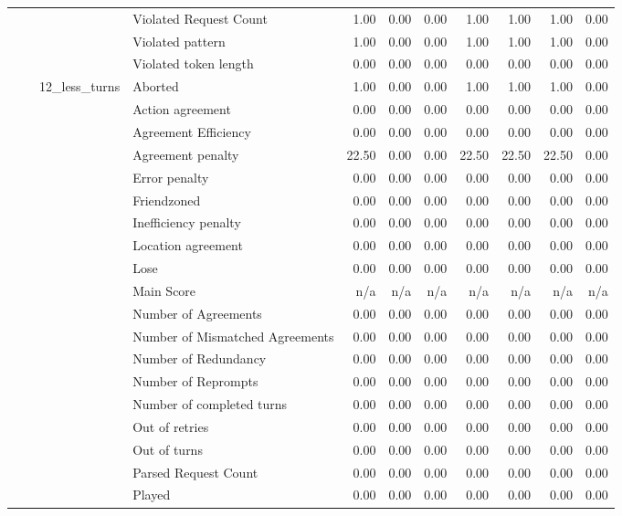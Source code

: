 \begin{tabular}{llllrrrrrrr}
 &  &  & Violated Request Count & 1.00 & 0.00 & 0.00 & 1.00 & 1.00 & 1.00 & 0.00 \\
 &  &  & Violated pattern & 1.00 & 0.00 & 0.00 & 1.00 & 1.00 & 1.00 & 0.00 \\
 &  &  & Violated token length & 0.00 & 0.00 & 0.00 & 0.00 & 0.00 & 0.00 & 0.00 \\
\cline{3-11}
 &  & \multirow[t]{27}{*}{12_less_turns} & Aborted & 1.00 & 0.00 & 0.00 & 1.00 & 1.00 & 1.00 & 0.00 \\
 &  &  & Action agreement & 0.00 & 0.00 & 0.00 & 0.00 & 0.00 & 0.00 & 0.00 \\
 &  &  & Agreement Efficiency & 0.00 & 0.00 & 0.00 & 0.00 & 0.00 & 0.00 & 0.00 \\
 &  &  & Agreement penalty & 22.50 & 0.00 & 0.00 & 22.50 & 22.50 & 22.50 & 0.00 \\
 &  &  & Error penalty & 0.00 & 0.00 & 0.00 & 0.00 & 0.00 & 0.00 & 0.00 \\
 &  &  & Friendzoned & 0.00 & 0.00 & 0.00 & 0.00 & 0.00 & 0.00 & 0.00 \\
 &  &  & Inefficiency penalty & 0.00 & 0.00 & 0.00 & 0.00 & 0.00 & 0.00 & 0.00 \\
 &  &  & Location agreement & 0.00 & 0.00 & 0.00 & 0.00 & 0.00 & 0.00 & 0.00 \\
 &  &  & Lose & 0.00 & 0.00 & 0.00 & 0.00 & 0.00 & 0.00 & 0.00 \\
 &  &  & Main Score & n/a & n/a & n/a & n/a & n/a & n/a & n/a \\
 &  &  & Number of Agreements & 0.00 & 0.00 & 0.00 & 0.00 & 0.00 & 0.00 & 0.00 \\
 &  &  & Number of Mismatched Agreements & 0.00 & 0.00 & 0.00 & 0.00 & 0.00 & 0.00 & 0.00 \\
 &  &  & Number of Redundancy & 0.00 & 0.00 & 0.00 & 0.00 & 0.00 & 0.00 & 0.00 \\
 &  &  & Number of Reprompts & 0.00 & 0.00 & 0.00 & 0.00 & 0.00 & 0.00 & 0.00 \\
 &  &  & Number of completed turns & 0.00 & 0.00 & 0.00 & 0.00 & 0.00 & 0.00 & 0.00 \\
 &  &  & Out of retries & 0.00 & 0.00 & 0.00 & 0.00 & 0.00 & 0.00 & 0.00 \\
 &  &  & Out of turns & 0.00 & 0.00 & 0.00 & 0.00 & 0.00 & 0.00 & 0.00 \\
 &  &  & Parsed Request Count & 0.00 & 0.00 & 0.00 & 0.00 & 0.00 & 0.00 & 0.00 \\
 &  &  & Played & 0.00 & 0.00 & 0.00 & 0.00 & 0.00 & 0.00 & 0.00 \\

\end{tabular}
